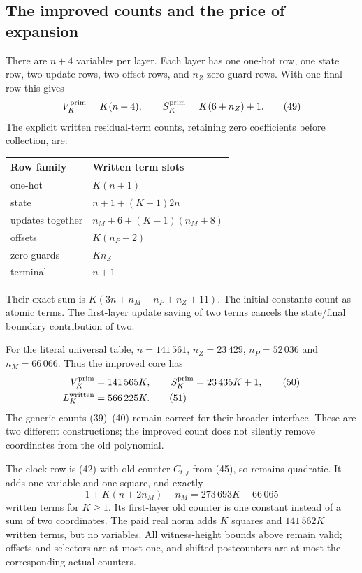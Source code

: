 \documentclass[11pt,a4paper]{article}
\numberwithin{equation}{section}
\begin{document}
\subsection{The improved counts and the price of expansion}
There are $n+4$ variables per layer. Each layer has one one-hot row, one
state row, two update rows, two offset rows, and $n_Z$ zero-guard rows. With
one final row this gives
\[
 V^{\rm prim}_K=K(n+4),\qquad S^{\rm prim}_K=K(6+n_Z)+1.          \tag{49}
\]
The explicit written residual-term counts, retaining zero coefficients
before collection, are:
\begin{center}
\begin{tabular}{ll}\toprule
Row family & Written term slots\\\midrule
one-hot & $K(n+1)$\\
state & $n+1+(K-1)2n$\\
updates together & $n_M+6+(K-1)(n_M+8)$\\
offsets & $K(n_P+2)$\\
zero guards & $Kn_Z$\\
terminal & $n+1$\\\bottomrule
\end{tabular}
\end{center}
Their exact sum is $K(3n+n_M+n_P+n_Z+11)$. The initial constants count as
atomic terms. The first-layer update saving of two terms cancels the
state/final boundary contribution of two.

For the literal universal table, $n=141\,561$, $n_Z=23\,429$,
$n_P=52\,036$ and $n_M=66\,066$. Thus the improved core has
\begin{align}
 V^{\rm prim}_K&=141\,565K,\qquad
 S^{\rm prim}_K=23\,435K+1,                             \tag{50}\\
 L^{\rm written}_K&=566\,225K.                          \tag{51}
\end{align}
The generic counts (39)--(40) remain correct for their broader interface.
These are two different constructions; the improved count does not silently
remove coordinates from the old polynomial.

The clock row is (42) with old counter $C_{t,j}$ from (45), so remains
quadratic. It adds one variable and one square, and exactly
\[
             1+K(n+2n_M)-n_M=273\,693K-66\,065          \tag{52}
\]
written terms for $K\ge1$. Its first-layer old counter is one constant
instead of a sum of two coordinates. The paid real norm adds $K$ squares
and $141\,562K$ written terms, but no variables. All witness-height bounds
above remain valid; offsets and selectors are at most one, and shifted
postcounters are at most the corresponding actual counters.
\end{document}

